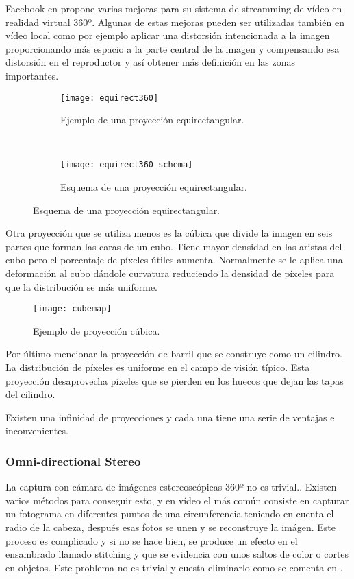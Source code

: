 Facebook en \cite{FBDynamicStreamming}  propone varias mejoras para su sistema de streamming de vídeo en realidad virtual 360º. Algunas de estas mejoras pueden ser utilizadas también en vídeo local como por ejemplo aplicar una distorsión intencionada a la imagen proporcionando más espacio a la parte central de la imagen y compensando esa distorsión en el reproductor y así obtener más definición en las zonas importantes.

\begin{figure}[h]
\centering
\begin{subfigure}{.8\linewidth}
	\centering
  \texttt{[image: equirect360]}
  \caption{Ejemplo de una proyección equirectangular.}
  \label{fig:equirect360-example}
\end{subfigure}\\
\begin{subfigure}{.8\linewidth}
	\centering
  \texttt{[image: equirect360-schema]}
  \caption{Esquema de una proyección equirectangular.}
  \label{fig:equirect360-schema}
\end{subfigure}
\end{figure}

Otra proyección que se utiliza menos es la cúbica que divide la imagen en seis partes que forman las caras de un cubo. Tiene mayor densidad en las aristas del cubo pero el porcentaje de píxeles útiles aumenta. Normalmente se le aplica una deformación al cubo dándole curvatura reduciendo la densidad de píxeles para que la distribución se más uniforme.

\begin{figure}[h]
  \centering
  \texttt{[image: cubemap]}
  \caption{Ejemplo de proyección cúbica.}
  \label{fig:cubemap-example}
\end{figure}

Por último mencionar la proyección de barril que se construye como un cilindro. La distribución de píxeles es uniforme en el campo de visión típico. Esta proyección desaprovecha píxeles que se pierden en los huecos que dejan las tapas del cilindro.

Existen una infinidad de proyecciones y cada una tiene una serie de ventajas e inconvenientes.
 
\subsubsection{Omni-directional Stereo}
La captura con cámara de imágenes estereoscópicas 360º no es trivial.. Existen varios métodos para conseguir esto, y en vídeo el más común consiste en capturar un fotograma en diferentes puntos de una circunferencia teniendo en cuenta el radio de la cabeza, después esas fotos se unen y se reconstruye la imágen. Este proceso es complicado y si no se hace bien, se produce un efecto en el ensambrado llamado stitching y que se evidencia con unos saltos de color o cortes en objetos. Este problema no es trivial y cuesta eliminarlo como se comenta en \cite{DiegoBezStitching}.


